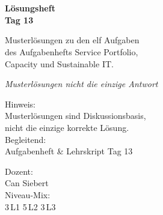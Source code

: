 \documentclass[11pt,a4paper,oneside]{article}
\newcommand{\caveatfontfallback}{\itshape}
\newcommand\caveatfont{\caveatfontfallback}%
\begin{document}
\begin{titlepage}
  \pagestyle{empty}
  \vspace*{1.5cm}
  \\[2pt]
  \noindent{\color{lpAccent}\rule{\linewidth}{1.2pt}}\\[4pt]

  \vspace{3cm}
  {\sffamily\fontsize{30}{34}\selectfont\bfseries\color{lpInk}L\"osungsheft\\Tag 13\par}

  \vspace{0.7cm}
  {\sffamily\large\color{lpGray}Musterl\"osungen zu den elf Aufgaben\\des Aufgabenhefts \textendash{} Service Portfolio,\\Capacity und Sustainable IT.\par}

  \vspace{1.5cm}
  {\caveatfont\LARGE\color{lpGreen}Musterl\"osungen \textperiodcentered{} nicht die einzige Antwort}\par

  \vfill

  \noindent\begin{minipage}{0.55\linewidth}
    {\sffamily\footnotesize\color{lpGray}Hinweis:}\\
    {\sffamily\small\color{lpInk}Musterl\"osungen sind Diskussionsbasis,\\nicht die einzige korrekte L\"osung.}\\[10pt]
    {\sffamily\footnotesize\color{lpGray}Begleitend:}\\
    {\sffamily\small\color{lpInk}Aufgabenheft \& Lehrskript Tag 13}
  \end{minipage}\hfill
  \begin{minipage}{0.4\linewidth}
    \raggedleft
    {\sffamily\footnotesize\color{lpGray}Dozent:}\\
    {\sffamily\small\color{lpInk}Can Siebert}\\[10pt]
    {\sffamily\footnotesize\color{lpGray}Niveau-Mix:}\\
    {\sffamily\small\color{lpInk}3\,L1 \textperiodcentered{} 5\,L2 \textperiodcentered{} 3\,L3}
  \end{minipage}

  \vspace{0.5cm}
  \noindent{\color{lpAccent}\rule{\linewidth}{0.6pt}}
\end{titlepage}
\end{document}
